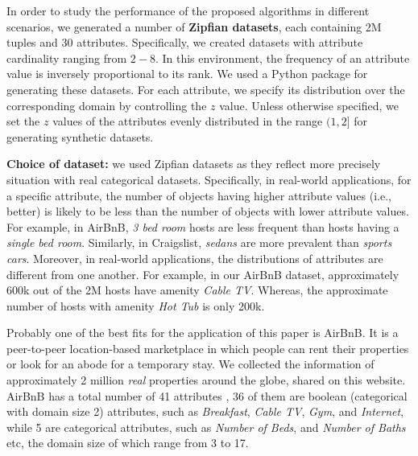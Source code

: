 \vspace{1mm}
In order to study the performance of the proposed algorithms in different scenarios, we generated a number of {\bf Zipfian datasets}, each containing 2M tuples and 30 attributes. Specifically, we created datasets with attribute cardinality ranging from  $2 - 8$. In this environment, the frequency of an attribute value is inversely proportional to its rank. 
We used a Python package for generating these datasets. For each attribute, we specify its distribution over the corresponding domain by controlling the $z$ value. 
Unless otherwise specified, we set the $z$ values of the attributes evenly distributed in the range $(1, 2]$ for generating synthetic datasets.


{\bf Choice of dataset:} we used Zipfian datasets as they reflect more precisely situation with real categorical datasets. Specifically, in real-world applications, for a specific attribute, the number of objects having higher attribute values (i.e., better) is likely to be less than the number of objects with lower attribute values. For example, in AirBnB, \emph{3 bed room} hosts are less frequent than hosts having a \emph{single bed room}. Similarly, in Craigslist, \emph{sedans} are more prevalent than \emph{sports cars}. Moreover, in real-world applications, the distributions of attributes are different from one another. For example, in our AirBnB dataset, approximately 600k out of the 2M hosts have amenity \emph{Cable TV}. Whereas, the approximate number of hosts with amenity \emph{Hot Tub} is only 200k.



\vspace{1mm}
 Probably one of the best fits for the application of this paper is AirBnB. It is a peer-to-peer location-based marketplace in which people can rent their properties or look for an abode for a temporary stay. We collected the information of approximately 2 million \emph{real} properties around the globe, shared on this website. AirBnB has a total number of 41 attributes
, 36 of them are boolean (categorical with domain size 2) attributes, such as \emph{Breakfast}, \emph{Cable TV}, \emph{Gym}, and \emph{Internet}, while 5 are categorical attributes, such as \emph{Number of Beds}, and \emph{Number of Baths} etc, the domain size of which range from 3 to 17. 


